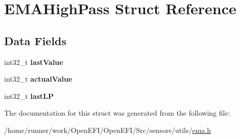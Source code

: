 \hypertarget{structEMAHighPass}{}\section{E\+M\+A\+High\+Pass Struct Reference}
\label{structEMAHighPass}
\subsection*{Data Fields}
\begin{DoxyCompactItemize}
\item 
\mbox{\label{structEMAHighPass_ae362411224fe2cfcded4e1c3ebcc2fa9}} 
int32\+\_\+t {\bfseries last\+Value}
\item 
\mbox{\label{structEMAHighPass_ac64287f46ee2c919fef1cc8a6e3eb211}} 
int32\+\_\+t {\bfseries actual\+Value}
\item 
\mbox{\label{structEMAHighPass_ab1a60ca7e3ed25924075e628fcd63c59}} 
int32\+\_\+t {\bfseries last\+LP}
\end{DoxyCompactItemize}


The documentation for this struct was generated from the following file\+:\begin{DoxyCompactItemize}
\item 
/home/runner/work/\+Open\+E\+F\+I/\+Open\+E\+F\+I/\+Src/sensors/utils/\hyperlink{ema_8h}{ema.\+h}\end{DoxyCompactItemize}
